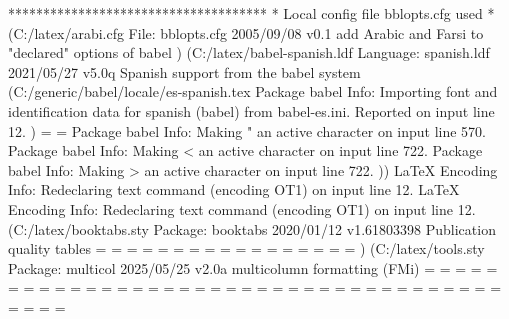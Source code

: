 *************************************
* Local config file bblopts.cfg used
*
(C:\Users\SEARS\AppData\Local\Programs\MiKTeX\tex/latex/arabi\bblopts.cfg
File: bblopts.cfg 2005/09/08 v0.1 add Arabic and Farsi to "declared" options of babel
) (C:\Users\SEARS\AppData\Local\Programs\MiKTeX\tex/latex/babel-spanish\spanish.ldf
Language: spanish.ldf 2021/05/27 v5.0q Spanish support from the babel system
 (C:\Users\SEARS\AppData\Local\Programs\MiKTeX\tex/generic/babel/locale/es\babel-spanish.tex
Package babel Info: Importing font and identification data for spanish
(babel)             from babel-es.ini. Reported on input line 12.
)
\es@quottoks=
\es@quotdepth=
Package babel Info: Making " an active character on input line 570.
Package babel Info: Making < an active character on input line 722.
Package babel Info: Making > an active character on input line 722.
))
LaTeX Encoding Info:    Redeclaring text command \guillemotleft (encoding OT1) on input line 12.
LaTeX Encoding Info:    Redeclaring text command \guillemotright (encoding OT1) on input line 12.
 (C:\Users\SEARS\AppData\Local\Programs\MiKTeX\tex/latex/booktabs\booktabs.sty
Package: booktabs 2020/01/12 v1.61803398 Publication quality tables
\heavyrulewidth=
\lightrulewidth=
\cmidrulewidth=
\belowrulesep=
\belowbottomsep=
\aboverulesep=
\abovetopsep=
\cmidrulesep=
\cmidrulekern=
=
\@cmidla=
\@cmidlb=
\@aboverulesep=
\@belowrulesep=
\@thisruleclass=
\@lastruleclass=
\@thisrulewidth=
) (C:\Users\SEARS\AppData\Local\Programs\MiKTeX\tex/latex/tools\multicol.sty
Package: multicol 2025/05/25 v2.0a multicolumn formatting (FMi)
\c@tracingmulticols=
\mult@box=
\multicol@leftmargin=
\c@unbalance=
\c@collectmore=
\doublecol@number=
\multicoltolerance=
\multicolpretolerance=
\full@width=
\page@free=
\premulticols=
\postmulticols=
\multicolsep=
\multicolbaselineskip=
\partial@page=
\last@line=
\mc@boxedresult=
\maxbalancingoverflow=
\mult@rightbox=
\mult@grightbox=
\mult@firstbox=
\mult@gfirstbox=
\@tempa=
\@tempa=
\@tempa=
\@tempa=
\@tempa=
\@tempa=
\@tempa=
\@tempa=
\@tempa=
\@tempa=
\@tempa=
\@tempa=
\@tempa=
\@tempa=
\@tempa=
\@tempa=
\@tempa=
\@tempa=
\@tempa=
